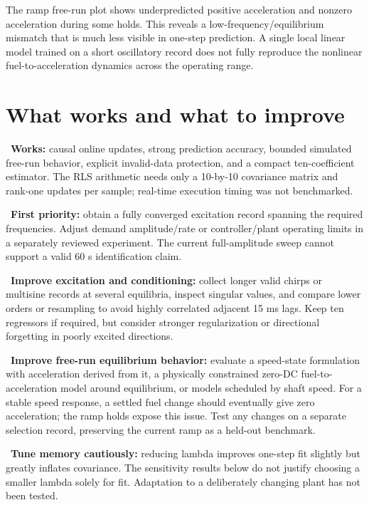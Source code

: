 The ramp free-run plot shows underpredicted positive acceleration and nonzero acceleration during some holds. This reveals a low-frequency/equilibrium mismatch that is much less visible in one-step prediction. A single local linear model trained on a short oscillatory record does not fully reproduce the nonlinear fuel-to-acceleration dynamics across the operating range.

\section{What works and what to improve}

\par\noindent\textbullet\ \textbf{Works:} causal online updates, strong prediction accuracy, bounded simulated free-run behavior, explicit invalid-data protection, and a compact ten-coefficient estimator. The RLS arithmetic needs only a 10-by-10 covariance matrix and rank-one updates per sample; real-time execution timing was not benchmarked.
\par\noindent\textbullet\ \textbf{First priority:} obtain a fully converged excitation record spanning the required frequencies. Adjust demand amplitude/rate or controller/plant operating limits in a separately reviewed experiment. The current full-amplitude sweep cannot support a valid 60 s identification claim.
\par\noindent\textbullet\ \textbf{Improve excitation and conditioning:} collect longer valid chirps or multisine records at several equilibria, inspect singular values, and compare lower orders or resampling to avoid highly correlated adjacent 15 ms lags. Keep ten regressors if required, but consider stronger regularization or directional forgetting in poorly excited directions.
\par\noindent\textbullet\ \textbf{Improve free-run equilibrium behavior:} evaluate a speed-state formulation with acceleration derived from it, a physically constrained zero-DC fuel-to-acceleration model around equilibrium, or models scheduled by shaft speed. For a stable speed response, a settled fuel change should eventually give zero acceleration; the ramp holds expose this issue. Test any changes on a separate selection record, preserving the current ramp as a held-out benchmark.
\par\noindent\textbullet\ \textbf{Tune memory cautiously:} reducing lambda improves one-step fit slightly but greatly inflates covariance. The sensitivity results below do not justify choosing a smaller lambda solely for fit. Adaptation to a deliberately changing plant has not been tested.
